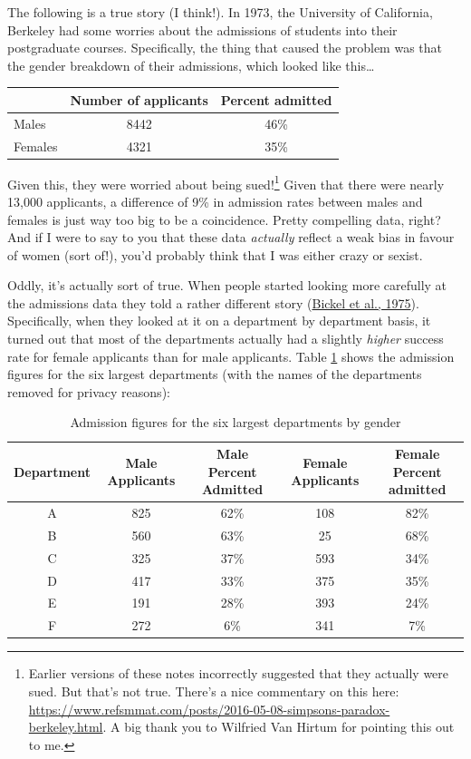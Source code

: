 \documentclass[
]{book}
\begin{document}
The following is a true story (I think!). In 1973, the University of California, Berkeley had some worries about the admissions of students into their postgraduate courses. Specifically, the thing that caused the problem was that the gender breakdown of their admissions, which looked like this\ldots{}

\begin{longtable}[]{@{}lcc@{}}
\toprule
& Number of applicants & Percent admitted\tabularnewline
\midrule
\endhead
Males & 8442 & 46\%\tabularnewline
Females & 4321 & 35\%\tabularnewline
\bottomrule
\end{longtable}

Given this, they were worried about being sued!\footnote{Earlier versions of these notes incorrectly suggested that they actually were sued. But that's not true. There's a nice commentary on this here: \url{https://www.refsmmat.com/posts/2016-05-08-simpsons-paradox-berkeley.html}. A big thank you to Wilfried Van Hirtum for pointing this out to me.} Given that there were nearly 13,000 applicants, a difference of 9\% in admission rates between males and females is just way too big to be a coincidence. Pretty compelling data, right? And if I were to say to you that these data \emph{actually} reflect a weak bias in favour of women (sort of!), you'd probably think that I was either crazy or sexist.

Oddly, it's actually sort of true. When people started looking more carefully at the admissions data they told a rather different story (\protect\hyperlink{ref-Bickel1975}{Bickel et al., 1975}). Specifically, when they looked at it on a department by department basis, it turned out that most of the departments actually had a slightly \emph{higher} success rate for female applicants than for male applicants. Table \ref{tab:simpsontable} shows the admission figures for the six largest departments (with the names of the departments removed for privacy reasons):

\begin{table}

\caption{\label{tab:simpsontable}Admission figures for the six largest departments by gender}
\centering
\begin{tabular}[t]{c|c|c|c|c}
\hline
Department & Male Applicants & Male Percent Admitted & Female Applicants & Female Percent admitted\\
\hline
A & 825 & 62\% & 108 & 82\%\\
\hline
B & 560 & 63\% & 25 & 68\%\\
\hline
C & 325 & 37\% & 593 & 34\%\\
\hline
D & 417 & 33\% & 375 & 35\%\\
\hline
E & 191 & 28\% & 393 & 24\%\\
\hline
F & 272 & 6\% & 341 & 7\%\\
\hline
\end{tabular}
\end{table}
\end{document}
